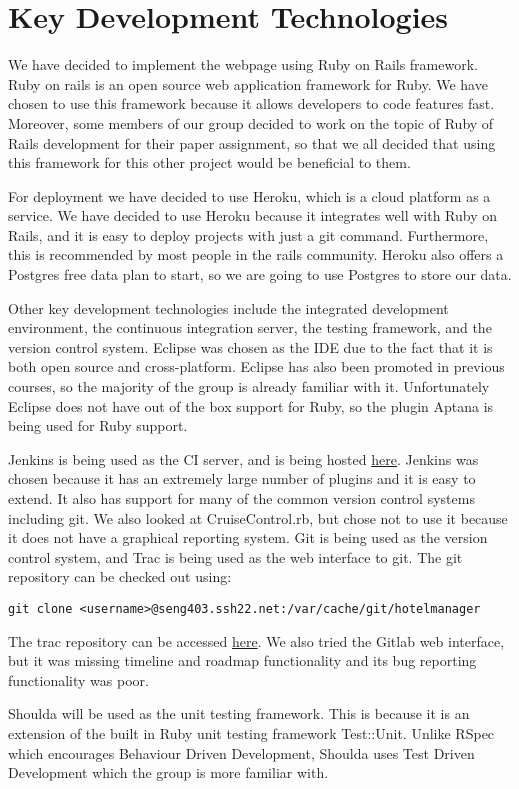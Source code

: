 \section{Key Development Technologies}

We have decided to implement the webpage using Ruby on Rails framework. Ruby on rails is an open source web application framework for Ruby. We have chosen to use this framework because it allows developers to code features fast. Moreover, some members of our group decided to work on the topic of Ruby of Rails development for their paper assignment, so that we all decided that using this framework for this other project would be beneficial to them.

For deployment we have decided to use Heroku, which is a cloud platform as a service. We have decided to use Heroku because it integrates well with Ruby on Rails, and it is easy to deploy projects with just a git command. Furthermore, this is recommended by most people in the rails community. Heroku also offers a Postgres free data plan to start, so we are going to use Postgres to store our data.

Other key development technologies include the integrated development environment, the continuous integration server, the testing framework, and the version control system. Eclipse was chosen as the IDE due to the fact that it is both open source and cross-platform. Eclipse has also been promoted in previous courses, so the majority of the group is already familiar with it. Unfortunately Eclipse does not have out of the box support for Ruby, so the plugin Aptana is being used for Ruby support.

Jenkins is being used as the CI server, and is being hosted \href{http://seng403.ssh22.net/jenkins}{here}. Jenkins was chosen because it has an extremely large number of plugins and it is easy to extend. It also has support for many of the common version control systems including git. We also looked at CruiseControl.rb, but chose not to use it because it does not have a graphical reporting system. Git is being used as the version control system, and Trac is being used as the web interface to git. The git repository can be checked out using:
\lstset{language=bash}
\begin{lstlisting}
git clone <username>@seng403.ssh22.net:/var/cache/git/hotelmanager
\end{lstlisting}
The trac repository can be accessed \href{http://seng403.ssh22.net/trac}{here}. We also tried the Gitlab web interface, but it was missing timeline and roadmap functionality and its bug reporting functionality was poor.

Shoulda will be used as the unit testing framework. This is because it is an extension of the built in Ruby unit testing framework Test::Unit. Unlike RSpec which encourages Behaviour Driven Development, Shoulda uses Test Driven Development which the group is more familiar with.
